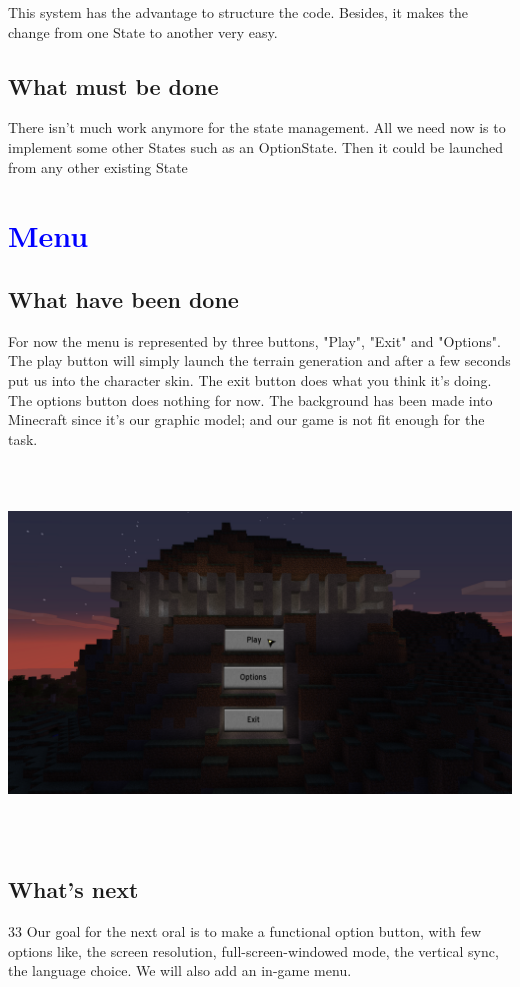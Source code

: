 \documentclass[article]{report} %
\begin{document}
This system has the advantage to structure the code. Besides, it makes the change from one State to another very easy.
			\section{What must be done}
		There isn't much work anymore for the state management. All we need now is to implement some other States such as an OptionState. Then it could be launched from any other existing State

		\chapter{\textcolor{blue}{Menu}}
			\section{What have been done}
				For now the menu is represented by three buttons, "Play", "Exit" and "Options". The play button will simply launch the terrain generation and after a few seconds put us into the character skin. The exit button does what you think it's doing. The options button does nothing for now. The background has been made into Minecraft since it's our graphic model; and our game is not fit enough for the task.
				\begin{center}
					\includegraphics[width=17cm, height=10cm]{images/Screenshots/GameMenu.png}
				\end{center}
			\section{What's next}33
				Our goal for the next oral is to make a functional option button,  with few options like, the screen resolution, full-screen-windowed mode, the vertical sync, the language choice. We will also add an in-game menu.
\end{document}
